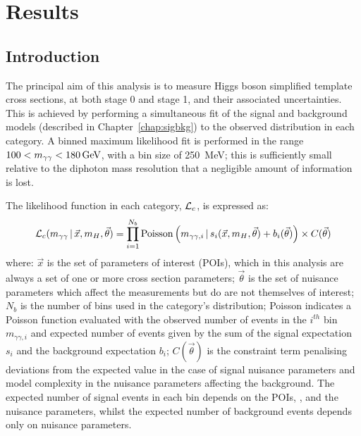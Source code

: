 \chapter{Results}
\label{chap:results}

\section{Introduction}
The principal aim of this analysis is to measure Higgs boson simplified template cross sections, 
at both stage 0 and stage 1, and their associated uncertainties.
This is achieved by performing a simultaneous fit of the signal and background models 
(described in Chapter~\ref{chap:sigbkg}) to the observed \mgg distribution in each category.
A binned maximum likelihood fit is performed in the range $100 < m_{\gamma\gamma} < \SI{180}{GeV}$, 
with a bin size of \SI{250}{MeV};
this is sufficiently small relative to the diphoton mass resolution 
that a negligible amount of information is lost. %

The likelihood function in each category, $\mathcal{L}_c$, is expressed as:
\begin{equation}
\mathcal{L}_c(m_{\gamma\gamma}\,|\,\vec{x},m_{H},\vec{\theta}) = \prod^{N_b}_{i=1} \textrm{Poisson}\left( m_{\gamma\gamma,i}\,|\, 
                  s_i(\vec{x},m_{H},\vec{\theta}) + b_i(\vec{\theta}) \right) \times C(\vec{\theta})
\end{equation}
where: $\vec{x}$ is the set of parameters of interest (POIs), 
which in this analysis are always a set of one or more cross section parameters;
$\vec{\theta}$ is the set of nuisance parameters which affect the measurements 
but do are not themselves of interest;
$N_b$ is the number of bins used in the category's \mgg distribution;
Poisson indicates a Poisson function evaluated with the observed number of events 
in the $i^{\mathit{th}}$ bin $m_{\gamma\gamma,i}$ 
and expected number of events given by the sum of the signal expectation $s_i$ 
and the background expectation $b_i$;
$C(\vec{\theta})$ is the constraint term penalising deviations 
from the expected value in the case of signal nuisance parameters
and model complexity in the nuisance parameters affecting the background.
The expected number of signal events in each bin depends on the POIs, \mH, 
and the nuisance parameters, 
whilst the expected number of background events depends only on nuisance parameters.


